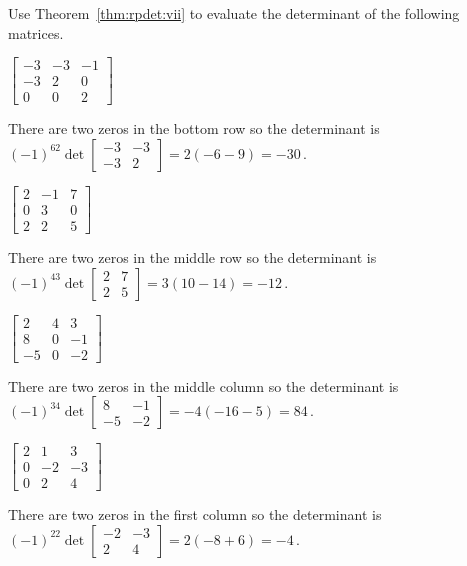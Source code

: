 \begin{example} \label{eg:rpdet}
Use Theorem~\ref{thm:rpdet:vii} to evaluate the determinant of the following matrices.  
\begin{parts}
\item \(\begin{bmatrix} -3&-3&-1\\-3&2&0\\0&0&2 \end{bmatrix}\)
\begin{solution} 
There are two zeros in the bottom row so the determinant is \((-1)^62\det\begin{bmatrix} -3&-3\\-3&2 \end{bmatrix}=2(-6-9)=-30\)\,. 
\end{solution}

\item \(\begin{bmatrix} 2&-1&7\\0&3&0\\2&2&5 \end{bmatrix}\)
\begin{solution} 
There are two zeros in the middle row so the determinant is \((-1)^43\det\begin{bmatrix} 2&7\\2&5 \end{bmatrix}=3(10-14)=-12\)\,. 
\end{solution}

\item \(\begin{bmatrix} 2&4&3\\8&0&-1\\-5&0&-2 \end{bmatrix}\)
\begin{solution} 
There are two zeros in the middle column so the determinant is \((-1)^34\det\begin{bmatrix} 8&-1\\-5&-2 \end{bmatrix}=-4(-16-5)=84\)\,. 
\end{solution}

\item \(\begin{bmatrix} 2&1&3\\0&-2&-3\\0&2&4 \end{bmatrix}\)
\begin{solution} 
There are two zeros in the first column so the determinant is \((-1)^22\det\begin{bmatrix} -2&-3\\2&4 \end{bmatrix}=2(-8+6)=-4\)\,. 
\end{solution}

\end{parts}
\end{example}




